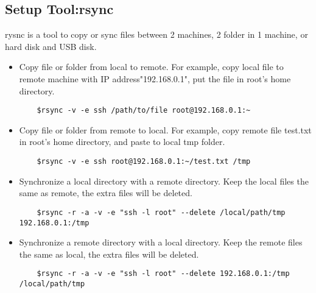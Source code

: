 \subsection{Setup Tool:rsync}
rysnc is a tool to copy or sync files between 2 machines, 2 folder in 1 machine, or hard disk and USB disk.\\
\begin{itemize}
    \item
    Copy file or folder from local to remote. For example, copy local file to remote machine with IP address"192.168.0.1", put the file in root's home directory.\\
    \begin{lstlisting}
    $rsync -v -e ssh /path/to/file root@192.168.0.1:~
    \end{lstlisting}
    \item
    Copy file or folder from remote to local. For example, copy remote file test.txt in root's home directory, and paste to local tmp folder. 
    \begin{lstlisting}
    $rsync -v -e ssh root@192.168.0.1:~/test.txt /tmp 
    \end{lstlisting}
    \item
     Synchronize a local directory with a remote directory. Keep the local files the same as remote, the extra files will be deleted. 
    \begin{lstlisting}
    $rsync -r -a -v -e "ssh -l root" --delete /local/path/tmp 192.168.0.1:/tmp
    \end{lstlisting}
    \item
    Synchronize a remote directory with a local directory. Keep the remote files the same as local, the extra files will be deleted. 
    \begin{lstlisting}
    $rsync -r -a -v -e "ssh -l root" --delete 192.168.0.1:/tmp /local/path/tmp
    \end{lstlisting}
\end{itemize}

